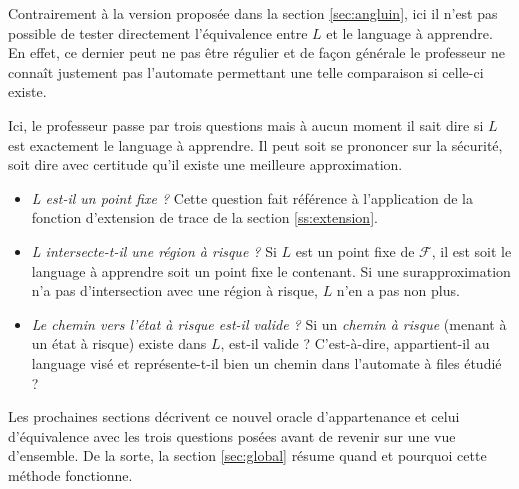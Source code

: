 Contrairement à la version proposée dans la section \ref{sec:angluin}, ici il n'est pas possible de tester directement l'équivalence entre $L$ et le language à apprendre. En effet, ce dernier peut ne pas être régulier et de façon générale le professeur ne connaît justement pas l'automate permettant une telle comparaison si celle-ci existe.

Ici, le professeur passe par trois questions mais à aucun moment il sait dire si $L$ est exactement le language à apprendre. Il peut soit se prononcer sur la sécurité, soit dire avec certitude qu'il existe une meilleure approximation.

\begin{itemize}
	\item \emph{L est-il un point fixe ?} Cette question fait référence à l'application de la fonction d'extension de trace de la section \ref{ss:extension}.
	\item \emph{L intersecte-t-il une région à risque ?} Si $L$ est un point fixe de $\mathcal{F}$, il est soit le language à apprendre soit un point fixe le contenant. Si une surapproximation n'a pas d'intersection avec une région à risque, $L$ n'en a pas non plus.
	\item \emph{Le chemin vers l'état à risque est-il valide ?} Si un \emph{chemin à risque} (menant à un état à risque) existe dans $L$, est-il valide ? C'est-à-dire, appartient-il au language visé et représente-t-il bien un chemin dans l'automate à files étudié ?
\end{itemize}

Les prochaines sections décrivent ce nouvel oracle d'appartenance et celui d'équivalence avec les trois questions posées avant de revenir sur une vue d'ensemble. De la sorte, la section \ref{sec:global} résume quand et pourquoi cette méthode fonctionne.
